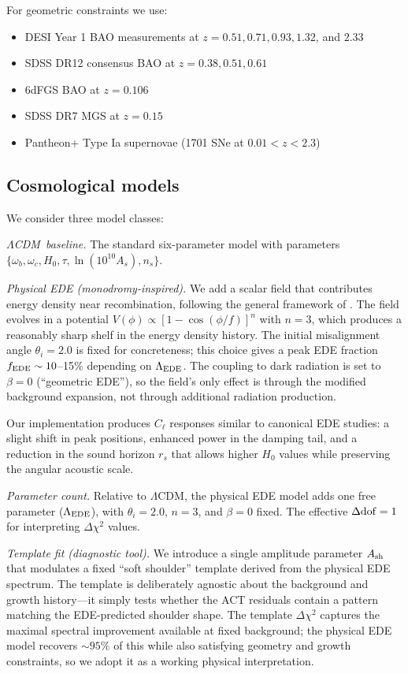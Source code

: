 \documentclass[twocolumn,showpacs,preprintnumbers,amsmath,amssymb,prd]{revtex4-2}
\newcommand{\lcdm}{$\Lambda$CDM}
\begin{document}
For geometric constraints we use:
\begin{itemize}
\item DESI Year 1 BAO measurements at $z = 0.51, 0.71, 0.93, 1.32$, and $2.33$
\item SDSS DR12 consensus BAO at $z = 0.38, 0.51, 0.61$
\item 6dFGS BAO at $z = 0.106$
\item SDSS DR7 MGS at $z = 0.15$
\item Pantheon+ Type Ia supernovae (1701 SNe at $0.01 < z < 2.3$)
\end{itemize}

\subsection{Cosmological models}

We consider three model classes:

\emph{\lcdm\ baseline.} The standard six-parameter model with parameters 
$\{\omega_b, \omega_c, H_0, \tau, \ln(10^{10}A_s), n_s\}$.

\emph{Physical EDE (monodromy-inspired).} We add a scalar field that contributes 
energy density near recombination, following the general framework of 
\cite{Poulin2019,Smith2020}. The field evolves in a potential $V(\phi) \propto 
[1 - \cos(\phi/f)]^n$ with $n = 3$, which produces a reasonably sharp shelf in 
the energy density history. The initial misalignment angle $\theta_i = 2.0$ is 
fixed for concreteness; this choice gives a peak EDE fraction $f_{\rm EDE} 
\sim 10$--15\% depending on $\Lambda_{\rm EDE}$. The coupling to dark radiation 
is set to $\beta = 0$ (``geometric EDE''), so the field's only effect is through 
the modified background expansion, not through additional radiation production.

Our implementation produces $C_\ell$ responses similar to canonical EDE studies: 
a slight shift in peak positions, enhanced power in the damping tail, and a 
reduction in the sound horizon $r_s$ that allows higher $H_0$ values while 
preserving the angular acoustic scale.

\emph{Parameter count.} Relative to \lcdm, the physical EDE model adds one 
free parameter ($\Lambda_{\rm EDE}$), with $\theta_i = 2.0$, $n = 3$, and 
$\beta = 0$ fixed. The effective $\Delta{\rm dof} = 1$ for interpreting 
$\Delta\chi^2$ values.

\emph{Template fit (diagnostic tool).} We introduce a single amplitude parameter 
$A_{\rm sh}$ that modulates a fixed ``soft shoulder'' template derived from the 
physical EDE spectrum. The template is deliberately agnostic about the background 
and growth history---it simply tests whether the ACT residuals contain a pattern 
matching the EDE-predicted shoulder shape. The template $\Delta\chi^2$ captures 
the maximal spectral improvement available at fixed background; the physical EDE 
model recovers $\sim 95\%$ of this while also satisfying geometry and growth 
constraints, so we adopt it as a working physical interpretation.
\end{document}

